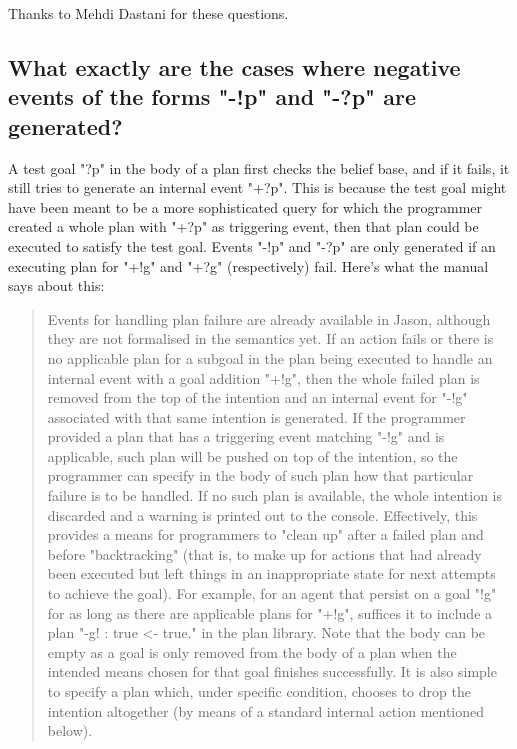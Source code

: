 \documentclass{article}
\begin{document}
\begin{description}
Thanks to Mehdi Dastani for these questions.

\subsection{What exactly are the cases where negative events of the forms
  "-!p" and "-?p" are generated?}

A test goal "?p" in the body of a plan first checks the belief base,
and if it fails, it still tries to generate an internal event
"+?p". This is because the test goal might have been meant to be a
more sophisticated query for which the programmer created a whole plan
with "+?p" as triggering event, then that plan could be executed to
satisfy the test goal. Events "-!p" and "-?p" are only generated if an
executing plan for "+!g" and "+?g" (respectively) fail. Here's what
the manual says about this:

\begin{quote}
  Events for handling plan failure are already available in Jason,
  although they are not formalised in the semantics yet. If an action
  fails or there is no applicable plan for a subgoal in the plan being
  executed to handle an internal event with a goal addition "+!g",
  then the whole failed plan is removed from the top of the intention
  and an internal event for "-!g" associated with that same intention
  is generated. If the programmer provided a plan that has a
  triggering event matching "-!g" and is applicable, such plan will be
  pushed on top of the intention, so the programmer can specify in the
  body of such plan how that particular failure is to be handled. If
  no such plan is available, the whole intention is discarded and a
  warning is printed out to the console. Effectively, this provides a
  means for programmers to "clean up" after a failed plan and before
  "backtracking" (that is, to make up for actions that had already
  been executed but left things in an inappropriate state for next
  attempts to achieve the goal). For example, for an agent that
  persist on a goal "!g" for as long as there are applicable plans for
  "+!g", suffices it to include a plan "-g! : true <- true." in the
  plan library. Note that the body can be empty as a goal is only
  removed from the body of a plan when the intended means chosen for
  that goal finishes successfully. It is also simple to specify a plan
  which, under specific condition, chooses to drop the intention
  altogether (by means of a standard internal action mentioned below).
\end{quote}


\end{description}
\end{document}
